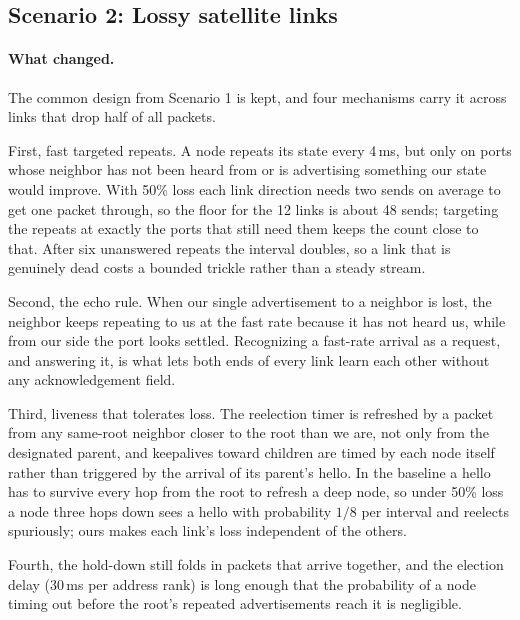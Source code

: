 \documentclass[11pt]{article}
\begin{document}
\subsection{Scenario 2: Lossy satellite links}

\paragraph{What changed.}
The common design from Scenario 1 is kept, and four mechanisms carry it across links that drop half of all packets.

First, fast targeted repeats.
A node repeats its state every 4\,ms, but only on ports whose neighbor has not been heard from or is advertising something our state would improve.
With 50\% loss each link direction needs two sends on average to get one packet through, so the floor for the 12 links is about 48 sends; targeting the repeats at exactly the ports that still need them keeps the count close to that.
After six unanswered repeats the interval doubles, so a link that is genuinely dead costs a bounded trickle rather than a steady stream.

Second, the echo rule.
When our single advertisement to a neighbor is lost, the neighbor keeps repeating to us at the fast rate because it has not heard us, while from our side the port looks settled.
Recognizing a fast-rate arrival as a request, and answering it, is what lets both ends of every link learn each other without any acknowledgement field.

Third, liveness that tolerates loss.
The reelection timer is refreshed by a packet from any same-root neighbor closer to the root than we are, not only from the designated parent, and keepalives toward children are timed by each node itself rather than triggered by the arrival of its parent's hello.
In the baseline a hello has to survive every hop from the root to refresh a deep node, so under 50\% loss a node three hops down sees a hello with probability $1/8$ per interval and reelects spuriously; ours makes each link's loss independent of the others.

Fourth, the hold-down still folds in packets that arrive together, and the election delay (30\,ms per address rank) is long enough that the probability of a node timing out before the root's repeated advertisements reach it is negligible.
\end{document}
